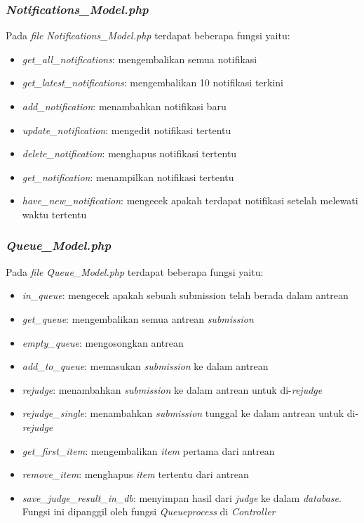 \subsubsection{\textit{Notifications\_Model.php}}
Pada \textit{file} \textit{Notifications\_Model.php} terdapat beberapa fungsi yaitu:
\begin{itemize}
	\item \textit{get\_all\_notifications}: mengembalikan semua notifikasi
	\item \textit{get\_latest\_notifications}: mengembalikan 10 notifikasi terkini
	\item \textit{add\_notification}: menambahkan notifikasi baru
	\item \textit{update\_notification}: mengedit notifikasi tertentu
	\item \textit{delete\_notification}: menghapus notifikasi tertentu
	\item \textit{get\_notification}: menampilkan notifikasi tertentu
	\item \textit{have\_new\_notification}: mengecek apakah terdapat notifikasi setelah melewati waktu tertentu
\end{itemize}

\subsubsection{\textit{Queue\_Model.php}}
Pada \textit{file} \textit{Queue\_Model.php} terdapat beberapa fungsi yaitu:
\begin{itemize}
	\item \textit{in\_queue}: mengecek apakah sebuah submission telah berada dalam antrean
	\item \textit{get\_queue}: mengembalikan semua antrean \textit{submission}
	\item \textit{empty\_queue}: mengosongkan antrean
	\item \textit{add\_to\_queue}: memasukan \textit{submission} ke dalam antrean
	\item \textit{rejudge}: menambahkan \textit{submission} ke dalam antrean untuk di-\textit{rejudge}
	\item \textit{rejudge\_single}: menambahkan \textit{submission} tunggal ke dalam antrean untuk di-\textit{rejudge}
	\item \textit{get\_first\_item}: mengembalikan \textit{item} pertama dari antrean
	\item \textit{remove\_item}: menghapus \textit{item} tertentu dari antrean
	\item \textit{save\_judge\_result\_in\_db}: menyimpan hasil dari \textit{judge} ke dalam \textit{database}. Fungsi ini dipanggil oleh fungsi \textit{Queueprocess} di \textit{Controller}
\end{itemize}

